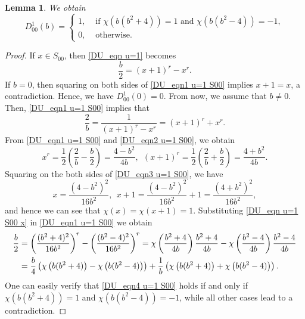 \documentclass[11pt]{article}
\numberwithin{theorem}{section}
\newtheorem{lemma}[theorem]{Lemma}
\begin{document}
\begin{lemma}\label{DU_lemma u=1 S00}
	We obtain
	\begin{equation*}
		D_{00}^1(b)=
		\begin{cases}
			1, &\text{ if }\chi\left(b(b^2+4)\right)=1\text{ and }\chi\left( b(b^2-4)\right) =-1,\\
			0, &\text{ otherwise.}
		\end{cases}
	\end{equation*}
\end{lemma}

\begin{proof}
	If $x\in S_{00}$, then \eqref{DU_eqn u=1} becomes
	\begin{equation}\label{DU_eqn1 u=1 S00}
		\frac{b}{2} = (x+1)^r-x^r.
	\end{equation}
	If $b=0$, then squaring on both sides of \eqref{DU_eqn1 u=1 S00} implies $x+1=x$, a contradiction. Hence, we have $D_{00}^1(0)=0$. From now, we assume that $b\ne 0$. Then, \eqref{DU_eqn1 u=1 S00} implies that
	\begin{equation}\label{DU_eqn2 u=1 S00}
		\frac{2}{b} = \frac{1}{(x+1)^r - x^r} = (x+1)^r + x^r.
	\end{equation}
	From \eqref{DU_eqn1 u=1 S00} and \eqref{DU_eqn2 u=1 S00}, we obtain
	\begin{equation}\label{DU_eqn3 u=1 S00}
		x^r = \frac{1}{2} \left( \frac{2}{b} - \frac{b}{2} \right) = \frac{4 - b^2}{4b}, \ \ (x+1)^r = \frac{1}{2} \left( \frac{2}{b} + \frac{b}{2} \right) = \frac{4 + b^2}{4b}.
	\end{equation}
	Squaring on the both sides of \eqref{DU_eqn3 u=1 S00}, we have
	\begin{equation}\label{DU_eqn u=1 S00 x}
		x=\frac{(4-b^2)^2}{16b^2}, \ \ x+1=\frac{(4-b^2)^2}{16b^2}+1=\frac{(4+b^2)^2}{16b^2},
	\end{equation}
	and hence we can see that $\chi(x)=\chi(x+1)=1$. Substituting \eqref{DU_eqn u=1 S00 x} in \eqref{DU_eqn1 u=1 S00} we obtain
	\begin{align}
		\frac{b}{2} &= \left( \frac{(b^2+4)^2}{16b^2}\right)^r -  \left( \frac{(b^2-4)^2}{16b^2}\right)^r =  \chi\left( \frac{b^2+4}{4b}\right)\frac{b^2+4}{4b} - \chi\left( \frac{b^2-4}{4b}\right)\frac{b^2-4}{4b} \notag\\
		&=\frac{b}{4}\left( \chi\left( b(b^2+4)\right)-\chi\left( b(b^2-4)\right) \right) + \frac{1}{b}\left( \chi\left( b(b^2+4)\right)+\chi\left( b(b^2-4)\right) \right).  \label{DU_eqn4 u=1 S00}
	\end{align}
	One can easily verify that \eqref{DU_eqn4 u=1 S00} holds if and only if $\chi\left(b(b^2+4)\right)=1$ and $\chi\left(b(b^2-4)\right)=-1$, while all other cases lead to a contradiction.
\end{proof}
\end{document}
